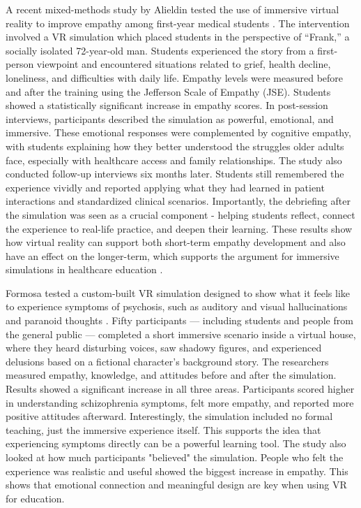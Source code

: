 A recent mixed-methods study by Alieldin \cite{Alieldin2024} tested the use of immersive virtual reality to improve empathy among first-year medical students \cite{Alieldin2024}. The intervention involved a VR simulation which placed students in the perspective of “Frank,” a socially isolated 72-year-old man. Students experienced the story from a first-person viewpoint and encountered situations related to grief, health decline, loneliness, and difficulties with daily life. Empathy levels were measured before and after the training using the Jefferson Scale of Empathy (JSE). Students showed a statistically significant increase in empathy scores. In post-session interviews, participants described the simulation as powerful, emotional, and immersive. These emotional responses were complemented by cognitive empathy, with students explaining how they better understood the struggles older adults face, especially with healthcare access and family relationships. The study also conducted follow-up interviews six months later. Students still remembered the experience vividly and reported applying what they had learned in patient interactions and standardized clinical scenarios. Importantly, the debriefing after the simulation was seen as a crucial component - helping students reflect, connect the experience to real-life practice, and deepen their learning. These results show how virtual reality can support both short-term empathy development and also have an effect on the longer-term, which supports the argument for immersive simulations in healthcare education \cite{Alieldin2024}.

\vspace{1em}

Formosa \cite{Formosa2018} tested a custom-built VR simulation designed to show what it feels like to experience symptoms of psychosis, such as auditory and visual hallucinations and paranoid thoughts \cite{Formosa2018}. Fifty participants — including students and people from the general public — completed a short immersive scenario inside a virtual house, where they heard disturbing voices, saw shadowy figures, and experienced delusions based on a fictional character’s background story. The researchers measured empathy, knowledge, and attitudes before and after the simulation. Results showed a significant increase in all three areas. Participants scored higher in understanding schizophrenia symptoms, felt more empathy, and reported more positive attitudes afterward. Interestingly, the simulation included no formal teaching, just the immersive experience itself. This supports the idea that experiencing symptoms directly can be a powerful learning tool. The study also looked at how much participants "believed" the simulation. People who felt the experience was realistic and useful showed the biggest increase in empathy. This shows that emotional connection and meaningful design are key when using VR for education. 

